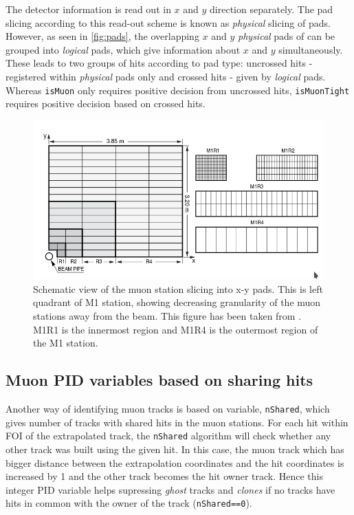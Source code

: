 The detector information is read out in $x$ and $y$ direction separately. The pad slicing according to this read-out scheme is known as \textit{physical} slicing of pads. However, as seen in \autoref{fig:pads}, the overlapping $x$ and $y$ \textit{physical} pads of can be grouped into \textit{logical} pads, which give information about $x$ and $y$ simultaneously. These leads to two groups of hits according to pad type: uncrossed hits - registered within \textit{physical} pads only and crossed hits - given by \textit{logical} pads. Whereas \texttt{isMuon} only requires positive decision from uncrossed hits, \texttt{isMuonTight} requires positive decision based on crossed hits. 


\begin{figure}[!h]
        \centering
        \includegraphics[width = 1.0\textwidth]{figs/trimuon/pad.png}
        \caption{Schematic view of the muon station slicing into x-y pads. This is left quadrant of M1 station, showing decreasing granularity of the muon stations away from the beam. This figure has been taken from \cite{LHCb-DP-2012-002}. M1R1 is the innermost region and M1R4 is the outermost region of the M1 station. }
        \label{fig:pads}
\end{figure}

\subsection{Muon PID variables based on sharing hits }
\label{bugs}

Another way of identifying muon tracks is based on variable, \texttt{nShared}, which gives number of tracks with shared hits in the muon stations. For each hit within \gls{FOI} of the extrapolated track, the \texttt{nShared} algorithm will check whether any other track was built using the given hit. In this case, the muon track which has bigger distance between the extrapolation coordinates and the hit coordinates is increased by 1 and the other track becomes the hit owner track. Hence this integer \gls{PID} variable helps supressing \textit{ghost} tracks and \textit{clones} if no tracks have hits in common with the owner of the track (\texttt{nShared==0}).

